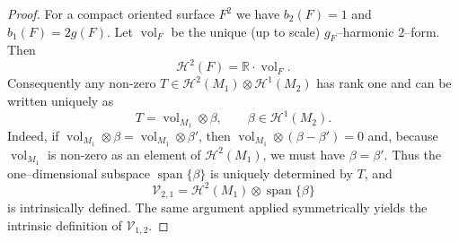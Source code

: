 \documentclass[10pt,a4paper]{amsart}
\begin{document}
\begin{proof}

For a compact oriented surface $F^2$ we have
$b_2(F)=1$ and $b_1(F)=2g(F)$.  Let $\operatorname{vol}_{F}$ be the unique
(up to scale) $g_F$--harmonic $2$--form.  Then
\[
\mathcal{H}^2(F)=\mathbb{R}\cdot\operatorname{vol}_{F}.
\]
Consequently any non-zero $T\in\mathcal{H}^2(M_1)\otimes\mathcal{H}^1(M_2)$
has rank one and can be written uniquely as
\[
T=\operatorname{vol}_{M_1}\otimes\beta,
\qquad \beta\in\mathcal{H}^1(M_2).
\]
Indeed, if $\operatorname{vol}_{M_1}\otimes\beta
=\operatorname{vol}_{M_1}\otimes\beta'$, then
$\operatorname{vol}_{M_1}\otimes(\beta-\beta')=0$ and, because
$\operatorname{vol}_{M_1}$ is non-zero as an element of $\mathcal{H}^2(M_1)$,
we must have $\beta=\beta'$.  Thus the one--dimensional subspace
$\operatorname{span}\{\beta\}$ is uniquely determined by $T$, and
\[
\mathcal{V}_{2,1}= \mathcal{H}^2(M_1)\otimes\operatorname{span}\{\beta\}
\]
is intrinsically defined.  The same argument applied symmetrically yields
the intrinsic definition of $\mathcal{V}_{1,2}$.
\end{proof}
\end{document}
